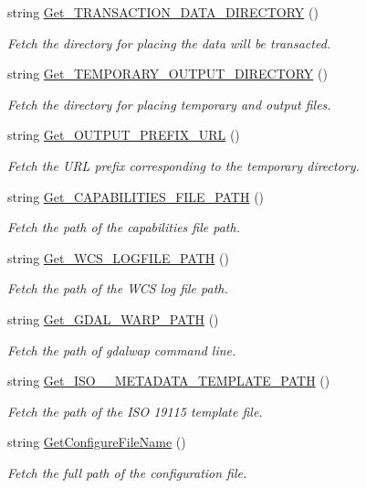 \begin{DoxyCompactItemize}
string \hyperlink{classWCS__Configure_af82cfb1889f6ba7ce9a44dc644f2badc}{Get\_\-TRANSACTION\_\-DATA\_\-DIRECTORY} ()
\begin{DoxyCompactList}\small\item\em Fetch the directory for placing the data will be transacted. \end{DoxyCompactList}\item 
string \hyperlink{classWCS__Configure_af4ae701e12b38013a75938e44b9cac54}{Get\_\-TEMPORARY\_\-OUTPUT\_\-DIRECTORY} ()
\begin{DoxyCompactList}\small\item\em Fetch the directory for placing temporary and output files. \end{DoxyCompactList}\item 
string \hyperlink{classWCS__Configure_a102b44721354ea7267a39d0ad06acee7}{Get\_\-OUTPUT\_\-PREFIX\_\-URL} ()
\begin{DoxyCompactList}\small\item\em Fetch the URL prefix corresponding to the temporary directory. \end{DoxyCompactList}\item 
string \hyperlink{classWCS__Configure_a484861bea7a237b7bc8a69aaee45fe9d}{Get\_\-CAPABILITIES\_\-FILE\_\-PATH} ()
\begin{DoxyCompactList}\small\item\em Fetch the path of the capabilities file path. \end{DoxyCompactList}\item 
string \hyperlink{classWCS__Configure_a9620adfd4bf1f21d35a1be4e2e2842d7}{Get\_\-WCS\_\-LOGFILE\_\-PATH} ()
\begin{DoxyCompactList}\small\item\em Fetch the path of the WCS log file path. \end{DoxyCompactList}\item 
string \hyperlink{classWCS__Configure_a8f7718a4c34d9c008ed908b53b87d85b}{Get\_\-GDAL\_\-WARP\_\-PATH} ()
\begin{DoxyCompactList}\small\item\em Fetch the path of gdalwap command line. \end{DoxyCompactList}\item 
string \hyperlink{classWCS__Configure_a31326fa9c015dc8c5fb79072b1af9ddd}{Get\_\-ISO\_\_\-METADATA\_\-TEMPLATE\_\-PATH} ()
\begin{DoxyCompactList}\small\item\em Fetch the path of the ISO 19115 template file. \end{DoxyCompactList}\item 
string \hyperlink{classWCS__Configure_a9d9c703b2c3fdde176e5b89a52786548}{GetConfigureFileName} ()
\begin{DoxyCompactList}\small\item\em Fetch the full path of the configuration file. \end{DoxyCompactList}\end{DoxyCompactItemize}


